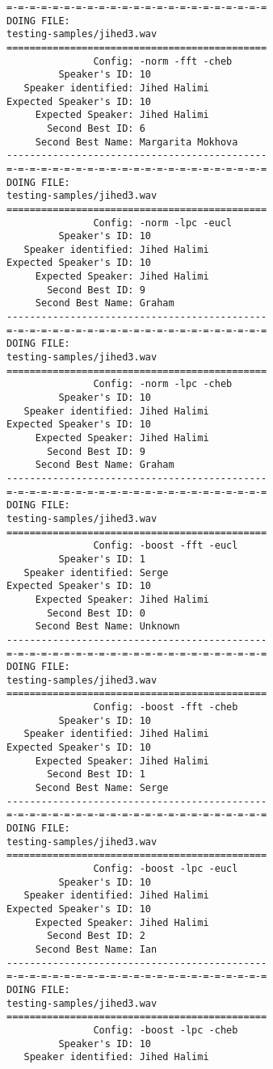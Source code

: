 \begin{verbatim}
=-=-=-=-=-=-=-=-=-=-=-=-=-=-=-=-=-=-=-=-=-=-=
DOING FILE:
testing-samples/jihed3.wav
=============================================
               Config: -norm -fft -cheb
         Speaker's ID: 10
   Speaker identified: Jihed Halimi
Expected Speaker's ID: 10
     Expected Speaker: Jihed Halimi
       Second Best ID: 6
     Second Best Name: Margarita Mokhova
---------------------------------------------
=-=-=-=-=-=-=-=-=-=-=-=-=-=-=-=-=-=-=-=-=-=-=
DOING FILE:
testing-samples/jihed3.wav
=============================================
               Config: -norm -lpc -eucl
         Speaker's ID: 10
   Speaker identified: Jihed Halimi
Expected Speaker's ID: 10
     Expected Speaker: Jihed Halimi
       Second Best ID: 9
     Second Best Name: Graham
---------------------------------------------
=-=-=-=-=-=-=-=-=-=-=-=-=-=-=-=-=-=-=-=-=-=-=
DOING FILE:
testing-samples/jihed3.wav
=============================================
               Config: -norm -lpc -cheb
         Speaker's ID: 10
   Speaker identified: Jihed Halimi
Expected Speaker's ID: 10
     Expected Speaker: Jihed Halimi
       Second Best ID: 9
     Second Best Name: Graham
---------------------------------------------
=-=-=-=-=-=-=-=-=-=-=-=-=-=-=-=-=-=-=-=-=-=-=
DOING FILE:
testing-samples/jihed3.wav
=============================================
               Config: -boost -fft -eucl
         Speaker's ID: 1
   Speaker identified: Serge
Expected Speaker's ID: 10
     Expected Speaker: Jihed Halimi
       Second Best ID: 0
     Second Best Name: Unknown
---------------------------------------------
=-=-=-=-=-=-=-=-=-=-=-=-=-=-=-=-=-=-=-=-=-=-=
DOING FILE:
testing-samples/jihed3.wav
=============================================
               Config: -boost -fft -cheb
         Speaker's ID: 10
   Speaker identified: Jihed Halimi
Expected Speaker's ID: 10
     Expected Speaker: Jihed Halimi
       Second Best ID: 1
     Second Best Name: Serge
---------------------------------------------
=-=-=-=-=-=-=-=-=-=-=-=-=-=-=-=-=-=-=-=-=-=-=
DOING FILE:
testing-samples/jihed3.wav
=============================================
               Config: -boost -lpc -eucl
         Speaker's ID: 10
   Speaker identified: Jihed Halimi
Expected Speaker's ID: 10
     Expected Speaker: Jihed Halimi
       Second Best ID: 2
     Second Best Name: Ian
---------------------------------------------
=-=-=-=-=-=-=-=-=-=-=-=-=-=-=-=-=-=-=-=-=-=-=
DOING FILE:
testing-samples/jihed3.wav
=============================================
               Config: -boost -lpc -cheb
         Speaker's ID: 10
   Speaker identified: Jihed Halimi

\end{verbatim}
